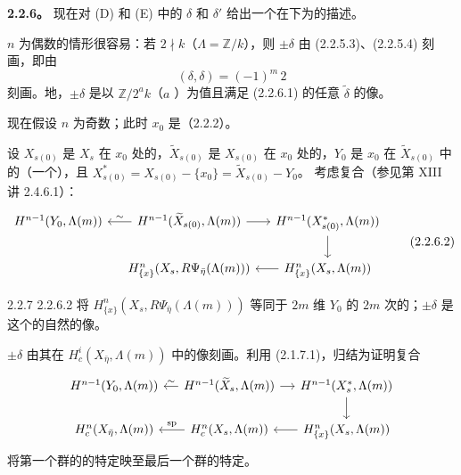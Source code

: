 \textbf{2.2.6。} 现在对 (D) 和 (E) 中的 $\delta$ 和 $\delta'$ 给出一个在下为的描述。

$n$ 为偶数的情形很容易：若 $2\nmid k$（$\Lambda=\mathbb Z/k$），则 $\pm\delta$ 由 (2.2.5.3)、(2.2.5.4) 刻画，即由
\[
 (\delta,\delta)=(-1)^m\,2\tag{2.2.6.1}
\]
刻画。地，$\pm\delta$ 是以 $\mathbb Z/2^ak$（$a$ ）为值且满足 (2.2.6.1) 的任意 $\widetilde\delta$ 的像。

现在假设 $n$ 为奇数；此时 $x_0$ 是（2.2.2）。

设 $X_{s(0)}$ 是 $X_s$ 在 $x_0$ 处的，$\widetilde X_{s(0)}$ 是 $X_{s(0)}$ 在 $x_0$ 处的，$Y_0$ 是 $x_0$ 在 $\widetilde X_{s(0)}$ 中的（一个），且
$X^*_{s(0)}=X_{s(0)}-\{x_0\}=\widetilde X_{s(0)}-Y_0$。
考虑复合（参见第 XIII 讲 2.4.6.1）：
\[
\begin{tikzcd}[column sep=small]
H^{n-1}(Y_0,\Lambda(m))&H^{n-1}(\widetilde X_{s(0)},\Lambda(m))\arrow[l,"\sim"']\arrow[r]&H^{n-1}(X^*_{s(0)},\Lambda(m))\arrow[d]\\
&H^n_{\{x\}}(X_s,R\Psi_{\bar\eta}(\Lambda(m)))&H^n_{\{x\}}(X_s,\Lambda(m))\arrow[l]
\end{tikzcd}\tag{2.2.6.2}
\]
\begin{SGAresult}{}{2.2.7}
 2.2.6.2 将 $H^n_{\{x\}}(X_s,R\Psi_{\bar\eta}(\Lambda(m)))$ 等同于 $2m$ 维 $Y_0$ 的 $2m$ 次的；$\pm\delta$ 是这个的自然的像。
\end{SGAresult}
 $\pm\delta$ 由其在 $H_c^i(X_{\bar\eta},\Lambda(m))$ 中的像刻画。利用 (2.1.7.1)，归结为证明复合
\[
\begin{tikzcd}[column sep=small]
H^{n-1}(Y_0,\Lambda(m))&H^{n-1}(\widetilde X_s,\Lambda(m))\arrow[l,"\sim"']\arrow[r]&H^{n-1}(X_s^*,\Lambda(m))\arrow[d]\\
H_c^n(X_{\bar\eta},\Lambda(m))&H_c^n(X_s,\Lambda(m))\arrow[l,"\operatorname{sp}"']&H^n_{\{x\}}(X_s,\Lambda(m))\arrow[l]
\end{tikzcd}
\]
将第一个群的的特定映至最后一个群的特定。


